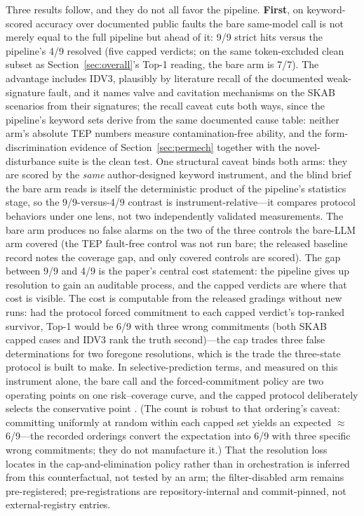 \documentclass[preprint,10pt]{elsarticle}
\begin{document}
Three results follow, and they do not all favor the pipeline. \textbf{First}, on keyword-scored accuracy over documented public faults the bare same-model call is not merely equal to the full pipeline but ahead of it: 9/9 strict hits versus the pipeline's 4/9 resolved (five capped verdicts; on the same token-excluded clean subset as Section~\ref{sec:overall}'s Top-1 reading, the bare arm is 7/7). The advantage includes IDV3, plausibly by literature recall of the documented weak-signature fault, and it names valve and cavitation mechanisms on the SKAB scenarios from their signatures; the recall caveat cuts both ways, since the pipeline's keyword sets derive from the same documented cause table: neither arm's absolute TEP numbers measure contamination-free ability, and the form-discrimination evidence of Section~\ref{sec:permech} together with the novel-disturbance suite is the clean test. One structural caveat binds both arms: they are scored by the \emph{same} author-designed keyword instrument, and the blind brief the bare arm reads is itself the deterministic product of the pipeline's statistics stage, so the 9/9-versus-4/9 contrast is instrument-relative---it compares protocol behaviors under one lens, not two independently validated measurements. The bare arm produces no false alarms on the two of the three controls the bare-LLM arm covered (the TEP fault-free control was not run bare; the released baseline record notes the coverage gap, and only covered controls are scored). The gap between 9/9 and 4/9 is the paper's central cost statement: the pipeline gives up resolution to gain an auditable process, and the capped verdicts are where that cost is visible. The cost is computable from the released gradings without new runs: had the protocol forced commitment to each capped verdict's top-ranked survivor, Top-1 would be 6/9 with three wrong commitments (both SKAB capped cases and IDV3 rank the truth second)---the cap trades three false determinations for two foregone resolutions, which is the trade the three-state protocol is built to make. In selective-prediction terms, and measured on this instrument alone, the bare call and the forced-commitment policy are two operating points on one risk--coverage curve, and the capped protocol deliberately selects the conservative point \cite{chow1970optimum,angelopoulos2023conformal}. (The count is robust to that ordering's caveat: committing uniformly at random within each capped set yields an expected $\approx$6/9---the recorded orderings convert the expectation into 6/9 with three specific wrong commitments; they do not manufacture it.) That the resolution loss locates in the cap-and-elimination policy rather than in orchestration is inferred from this counterfactual, not tested by an arm; the filter-disabled arm remains pre-registered; pre-registrations are repository-internal and commit-pinned, not external-registry entries.
\end{document}
